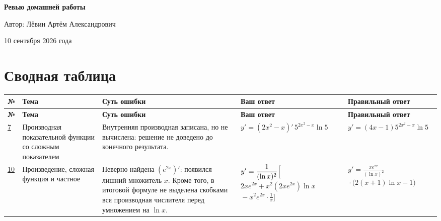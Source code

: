 \documentclass[12pt,a4paper]{article}
\begin{document}
\begin{titlepage}
\centering
\vspace*{0.23\textheight}
{\LARGE\bfseries Ревью домашней работы\par}
\vspace{2.2cm}
{\large Автор: Лёвин Артём Александрович\par}
\vspace{0.8cm}
{\large 10 сентября 2026 года\par}
\vfill
{}
\vspace*{1.2cm}
\end{titlepage}

\newpage
\section*{Сводная таблица}
\scriptsize
\setlength{\tabcolsep}{3pt}
\begin{longtable}{>{\centering\arraybackslash}p{0.7cm} >{\raggedright\arraybackslash}p{2.4cm} >{\raggedright\arraybackslash}p{4.0cm} >{\raggedright\arraybackslash}p{4.3cm} >{\raggedright\arraybackslash}p{4.3cm}}
\toprule
\textbf{№} & \textbf{Тема} & \textbf{Суть ошибки} & \textbf{Ваш ответ} & \textbf{Правильный ответ} \\
\midrule
\endfirsthead
\toprule
\textbf{№} & \textbf{Тема} & \textbf{Суть ошибки} & \textbf{Ваш ответ} & \textbf{Правильный ответ} \\
\midrule
\endhead
\hyperref[task:7]{7}
& Производная показательной функции со сложным показателем
& Внутренняя производная записана, но не вычислена: решение не доведено до конечного результата.
& $y'=(2x^2-x)'\,5^{2x^2-x}\ln 5$
& $y'=(4x-1)5^{2x^2-x}\ln 5$ \\
\midrule
\hyperref[task:10]{10}
& Произведение, сложная функция и частное
& Неверно найдена $(e^{2x})'$: появился лишний множитель $x$. Кроме того, в итоговой формуле не выделена скобками вся производная числителя перед умножением на $\ln x$.
& $\displaystyle y'=\frac{1}{(\ln x)^2}\Bigl[$\newline
  $\displaystyle 2xe^{2x}+x^2(2xe^{2x})\ln x$\newline
  $\displaystyle {}-x^2e^{2x}\cdot\frac1x\Bigr]$
& $\displaystyle y'=\frac{xe^{2x}}{(\ln x)^2}$\newline
  $\displaystyle {}\cdot\bigl(2(x+1)\ln x-1\bigr)$ \\
\bottomrule
\end{longtable}
\normalsize
\setlength{\tabcolsep}{6pt}
\end{document}

